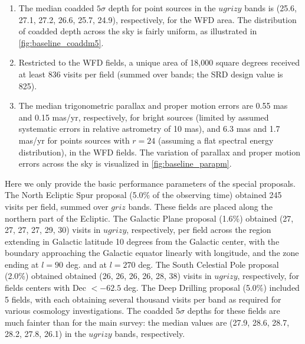 \documentclass[DM,lsstdraft,authoryear,toc]{lsstdoc}
\begin{document}
\begin{enumerate}
\item The median coadded $5\sigma$ depth
for point sources in the $ugrizy$ bands is (25.6, 27.1, 27.2, 26.6,
25.7, 24.9), respectively, for the WFD area. The distribution
of coadded depth across the sky is fairly uniform, as illustrated in \autoref{fig:baseline_coaddm5}.

\item Restricted to the WFD fields, a unique area of
18,000 square degrees received at least 836 visits per field (summed over bands;
the SRD design value is 825).

\item The median trigonometric parallax and proper motion errors are
0.55 mas and 0.15 mas/yr, respectively, for bright sources (limited by
assumed systematic errors in relative astrometry of 10 mas), and 6.3
mas and 1.7 mas/yr for points sources with $r=24$ (assuming a flat
spectral energy distribution), in the WFD fields. The variation of parallax
and proper motion errors across the sky is visualized in \autoref{fig:baseline_parapm}.
\end{enumerate}

Here we only provide the basic
performance parameters of the special proposals. 
The North Ecliptic Spur proposal (5.0\% of the observing time) obtained  245 visits per field, summed over $griz$ bands. 
These fields are placed along the northern part of the Ecliptic. 
The Galactic Plane proposal (1.6\%) obtained (27, 27, 27, 27, 29, 30) visits in $ugrizy$, respectively, per field
across the region extending in Galactic latitude 10 degrees
from the Galactic center, with the boundary approaching the Galactic
equator linearly with longitude, and the zone ending at $l=90$ deg.
and at $l=270$ deg. 
The South Celestial Pole proposal (2.0\%) obtained
obtained (26, 26, 26, 26, 28, 38) visits in $ugrizy$, respectively, for fields centers with Dec $<-62.5$ deg. 
The Deep Drilling proposal (5.0\%) included 5 fields, with each obtaining several thousand visits per band 
as required for various cosmology investigations. The coadded $5\sigma$ depths for these fields are much 
fainter than for the main survey: the median values are (27.9, 28.6, 28.7, 28.2, 27.8, 26.1) in the $ugrizy$ bands, respectively.
\end{document}
